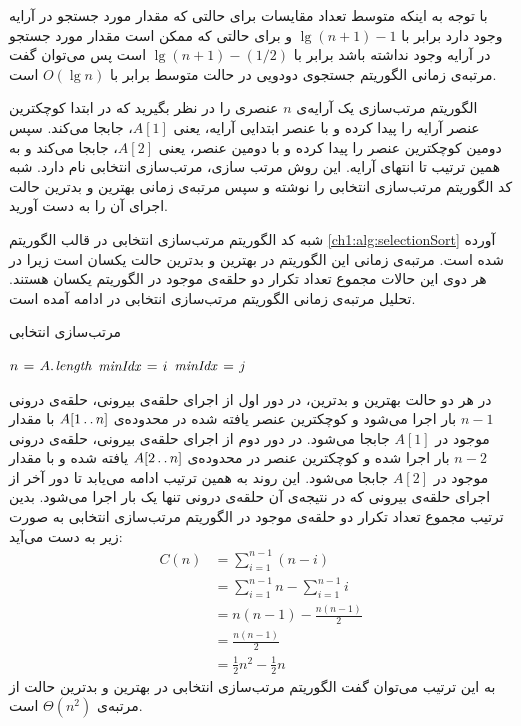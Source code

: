 {با توجه به اینکه متوسط تعداد مقایسات برای حالتی که مقدار مورد جستجو در آرایه وجود دارد برابر با {$\lg (n+1) - 1$} و برای حالتی که ممکن است مقدار مورد جستجو در آرایه وجود نداشته باشد برابر با {$\lg (n+1) - (1/2)$} است پس می‌توان گفت مرتبه‌ی زمانی الگوریتم جستجوی دودویی در حالت متوسط برابر با {$O(\lg n)$} است.

 الگوریتم مرتب‌سازی یک آرایه‌ی {$n$} عنصری را در نظر بگیرید که در ابتدا کوچکترین عنصر آرایه را پیدا کرده و با عنصر ابتدایی آرایه، یعنی {$A[1]$}، جابجا می‌کند. سپس دومین کوچکترین عنصر را پیدا کرده و با دومین عنصر، یعنی {$A[2]$}، جابجا می‌کند و به همین ترتیب تا انتهای آرایه. این روش مرتب سازی، مرتب‌سازی انتخابی نام دارد. شبه ‌کد الگوریتم مرتب‌سازی انتخابی را نوشته و سپس مرتبه‌ی زمانی بهترین و بدترین حالت اجرای آن را به دست آورید.


شبه ‌کد الگوریتم مرتب‌سازی انتخابی در قالب الگوریتم {\eqref{ch1:alg:selectionSort}} آورده شده است. مرتبه‌ی زمانی این الگوریتم در بهترین و بدترین حالت یکسان است زیرا در هر دوی این حالات مجموع تعداد تکرار دو حلقه‌ی موجود در الگوریتم یکسان هستند. تحلیل مرتبه‌ی زمانی الگوریتم مرتب‌سازی انتخابی در ادامه آمده است.

\begin{algorithm}
\caption{مرتب‌سازی انتخابی}\label{ch1:alg:selectionSort}
\begin{latin}
\begin{algorithmic}[1]
		\State	$n \mathrel{\hspace{1pt}=\hspace{1pt}} A.\hspace*{1pt}\mathit{length}$
				\State	$\mathit{minIdx} \mathrel{\hspace{1pt}=\hspace{1pt}} i $
								\State	$\mathit{minIdx} \mathrel{\hspace{1pt}=\hspace{1pt}} j$						
						\EndIf
				\EndFor
				\State	{}
		\EndFor
\EndProcedure
\end{algorithmic}
\end{latin}
\end{algorithm}

در هر دو حالت بهترین و بدترین، در دور اول از اجرای حلقه‌ی بیرونی، حلقه‌ی درونی {$n-1$} بار اجرا می‌شود و کوچکترین عنصر یافته شده در محدوده‌ی {$A[1\mathinner{\ldotp\ldotp} n]$} با مقدار موجود در {$A[1]$} جابجا می‌شود. در دور دوم از اجرای حلقه‌ی بیرونی، حلقه‌ی درونی {$n-2$} بار اجرا شده و کوچکترین عنصر در محدوده‌ی {$A[2\mathinner{\ldotp\ldotp} n]$} یافته شده  و با مقدار موجود در {$A[2]$} جابجا می‌شود. این روند به همین ترتیب ادامه می‌یابد تا دور آخر از اجرای حلقه‌ی بیرونی که در نتیجه‌ی آن حلقه‌ی درونی تنها یک بار اجرا می‌شود. بدین ترتیب مجموع تعداد تکرار دو حلقه‌ی موجود در الگوریتم مرتب‌سازی انتخابی به صورت زیر به دست می‌آید:
\begin{align*}
C(n) &= \sum_{i=1}^{n-1}{(n-i)}\\
&=\sum_{i=1}^{n-1}{n} - \sum_{i=1}^{n-1}{i}\\
&=n(n-1) - \frac{n(n-1)}{2}\\
&= \frac{n(n-1)}{2}\\
&= \frac{1}{2}n^2-\frac{1}{2}n
\end{align*}
به این ترتیب می‌توان گفت الگوریتم مرتب‌سازی انتخابی در بهترین و بدترین حالت از مرتبه‌ی {$\Theta (n^2)$} است.

}
